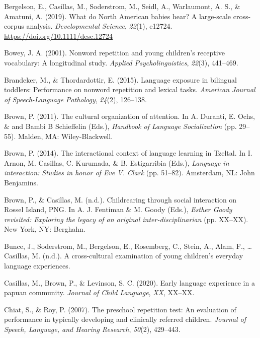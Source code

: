 \documentclass[english,,man,floatsintext]{apa6}
\begin{document}
\leavevmode\hypertarget{ref-bergelsoncasillas2019what}{}%
Bergelson, E., Casillas, M., Soderstrom, M., Seidl, A., Warlaumont, A. S., \& Amatuni, A. (2019). What do North American babies hear? A large-scale cross-corpus analysis. \emph{Developmental Science}, \emph{22}(1), e12724. \url{https://doi.org/10.1111/desc.12724}

\leavevmode\hypertarget{ref-bowey2001nonword}{}%
Bowey, J. A. (2001). Nonword repetition and young children's receptive vocabulary: A longitudinal study. \emph{Applied Psycholinguistics}, \emph{22}(3), 441--469.

\leavevmode\hypertarget{ref-brandeker2015language}{}%
Brandeker, M., \& Thordardottir, E. (2015). Language exposure in bilingual toddlers: Performance on nonword repetition and lexical tasks. \emph{American Journal of Speech-Language Pathology}, \emph{24}(2), 126--138.

\leavevmode\hypertarget{ref-brown2011cultural}{}%
Brown, P. (2011). The cultural organization of attention. In A. Duranti, E. Ochs, \& and Bambi B Schieffelin (Eds.), \emph{Handbook of Language Socialization} (pp. 29--55). Malden, MA: Wiley-Blackwell.

\leavevmode\hypertarget{ref-brown2014interactional}{}%
Brown, P. (2014). The interactional context of language learning in Tzeltal. In I. Arnon, M. Casillas, C. Kurumada, \& B. Estigarribia (Eds.), \emph{Language in interaction: Studies in honor of Eve V. Clark} (pp. 51--82). Amsterdam, NL: John Benjamins.

\leavevmode\hypertarget{ref-brownIPchildrearing}{}%
Brown, P., \& Casillas, M. (n.d.). Childrearing through social interaction on Rossel Island, PNG. In A. J. Fentiman \& M. Goody (Eds.), \emph{Esther Goody revisited: Exploring the legacy of an original inter-disciplinarian} (pp. XX--XX). New York, NY: Berghahn.

\leavevmode\hypertarget{ref-bunceURcrosscultural}{}%
Bunce, J., Soderstrom, M., Bergelson, E., Rosemberg, C., Stein, A., Alam, F., \ldots{} Casillas, M. (n.d.). A cross-cultural examination of young children's everyday language experiences.

\leavevmode\hypertarget{ref-casillas2020early}{}%
Casillas, M., Brown, P., \& Levinson, S. C. (2020). Early language experience in a papuan community. \emph{Journal of Child Language}, \emph{XX}, XX--XX.

\leavevmode\hypertarget{ref-chiat2007preschool}{}%
Chiat, S., \& Roy, P. (2007). The preschool repetition test: An evaluation of performance in typically developing and clinically referred children. \emph{Journal of Speech, Language, and Hearing Research}, \emph{50}(2), 429--443.
\end{document}
